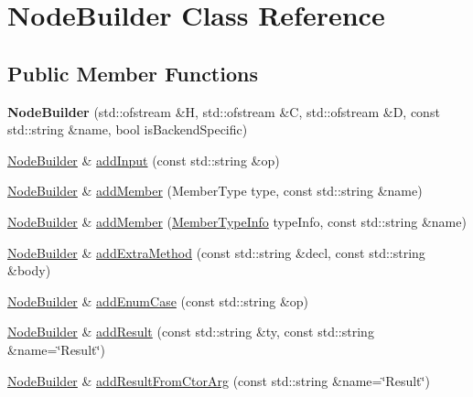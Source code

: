 \hypertarget{class_node_builder}{}\section{Node\+Builder Class Reference}
\label{class_node_builder}
\subsection*{Public Member Functions}
\begin{DoxyCompactItemize}
\item 
\mbox{\label{class_node_builder_a00f02ac86d38091054d2866aa51d836c}} 
{\bfseries Node\+Builder} (std\+::ofstream \&H, std\+::ofstream \&C, std\+::ofstream \&D, const std\+::string \&name, bool is\+Backend\+Specific)
\item 
\hyperlink{class_node_builder}{Node\+Builder} \& \hyperlink{class_node_builder_ad1aa1ad3f01f69333c848b40f4b50b93}{add\+Input} (const std\+::string \&op)
\item 
\hyperlink{class_node_builder}{Node\+Builder} \& \hyperlink{class_node_builder_a4ac09350245a07d8187b96bdd641d04d}{add\+Member} (Member\+Type type, const std\+::string \&name)
\item 
\hyperlink{class_node_builder}{Node\+Builder} \& \hyperlink{class_node_builder_a1805b1960d8247e34b816409e3fc8d68}{add\+Member} (\hyperlink{struct_member_type_info}{Member\+Type\+Info} type\+Info, const std\+::string \&name)
\item 
\hyperlink{class_node_builder}{Node\+Builder} \& \hyperlink{class_node_builder_ab2a15b943fa94aac99cddb5b92b439e9}{add\+Extra\+Method} (const std\+::string \&decl, const std\+::string \&body)
\item 
\hyperlink{class_node_builder}{Node\+Builder} \& \hyperlink{class_node_builder_a971697859997389e6f2fe2a56d99267a}{add\+Enum\+Case} (const std\+::string \&op)
\item 
\hyperlink{class_node_builder}{Node\+Builder} \& \hyperlink{class_node_builder_a605fddc6415045aba18d5756ff9739f7}{add\+Result} (const std\+::string \&ty, const std\+::string \&name=\char`\"{}Result\char`\"{})
\item 
\hyperlink{class_node_builder}{Node\+Builder} \& \hyperlink{class_node_builder_a62ee041879e95ec36c120159e4dc2277}{add\+Result\+From\+Ctor\+Arg} (const std\+::string \&name=\char`\"{}Result\char`\"{})
\item 
\mbox{\label{class_node_builder_a15df8c1e24ddd6cc779cb4ed5e5eace2}} 

\end{DoxyCompactItemize}
